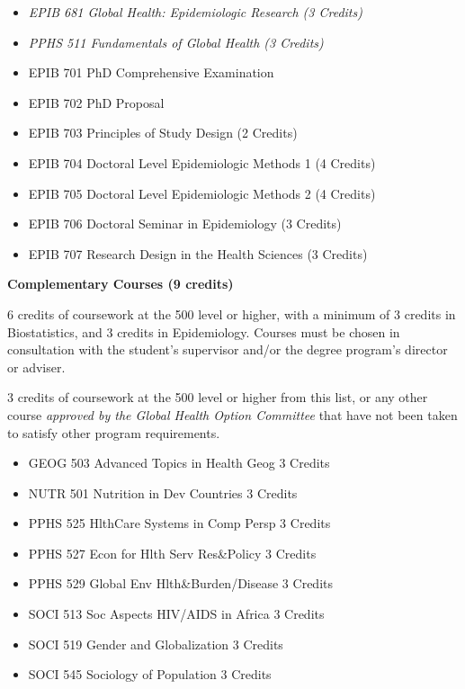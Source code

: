 \documentclass[
]{book}
\providecommand{\tightlist}{%
  \setlength{\itemsep}{0pt}\setlength{\parskip}{0pt}}
\begin{document}
\begin{itemize}
\tightlist
\item
  \emph{EPIB 681 Global Health: Epidemiologic Research (3 Credits)}
\item
  \emph{PPHS 511 Fundamentals of Global Health (3 Credits)}
\item
  EPIB 701 PhD Comprehensive Examination
\item
  EPIB 702 PhD Proposal
\item
  EPIB 703 Principles of Study Design (2 Credits)
\item
  EPIB 704 Doctoral Level Epidemiologic Methods 1 (4 Credits)
\item
  EPIB 705 Doctoral Level Epidemiologic Methods 2 (4 Credits)
\item
  EPIB 706 Doctoral Seminar in Epidemiology (3 Credits)
\item
  EPIB 707 Research Design in the Health Sciences (3 Credits)
\end{itemize}

\textbf{Complementary Courses (9 credits)}

6 credits of coursework at the 500 level or higher, with a minimum of 3 credits in Biostatistics, and 3 credits in Epidemiology. Courses must be chosen in consultation with the student's supervisor and/or the degree program's director or adviser.

3 credits of coursework at the 500 level or higher from this list, or any other course \emph{approved by the Global Health Option Committee} that have not been taken to satisfy other program requirements.

\begin{itemize}
\tightlist
\item
  GEOG 503 Advanced Topics in Health Geog 3 Credits
\item
  NUTR 501 Nutrition in Dev Countries 3 Credits
\item
  PPHS 525 HlthCare Systems in Comp Persp 3 Credits
\item
  PPHS 527 Econ for Hlth Serv Res\&Policy 3 Credits
\item
  PPHS 529 Global Env Hlth\&Burden/Disease 3 Credits
\item
  SOCI 513 Soc Aspects HIV/AIDS in Africa 3 Credits
\item
  SOCI 519 Gender and Globalization 3 Credits
\item
  SOCI 545 Sociology of Population 3 Credits
\end{itemize}
\end{document}
